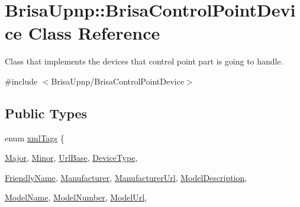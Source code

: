 \hypertarget{classBrisaUpnp_1_1BrisaControlPointDevice}{
\section{BrisaUpnp::BrisaControlPointDevice Class Reference}
\label{classBrisaUpnp_1_1BrisaControlPointDevice}
}


Class that implements the devices that control point part is going to handle.  


{\ttfamily \#include $<$BrisaUpnp/BrisaControlPointDevice$>$}\subsection*{Public Types}
\begin{DoxyCompactItemize}
\item 
enum \hyperlink{classBrisaUpnp_1_1BrisaControlPointDevice_a8aaeeda62adcdbd531f5a14bb52c1739}{xmlTags} \{ \par
\hyperlink{classBrisaUpnp_1_1BrisaControlPointDevice_a8aaeeda62adcdbd531f5a14bb52c1739a67178f0c87df8335b2fb6e3c5f10200c}{Major}, 
\hyperlink{classBrisaUpnp_1_1BrisaControlPointDevice_a8aaeeda62adcdbd531f5a14bb52c1739ab9b6e3b735237263296ca57fb92c2bfb}{Minor}, 
\hyperlink{classBrisaUpnp_1_1BrisaControlPointDevice_a8aaeeda62adcdbd531f5a14bb52c1739a0fe1c61d0f61213034a3c69b18f49875}{UrlBase}, 
\hyperlink{classBrisaUpnp_1_1BrisaControlPointDevice_a8aaeeda62adcdbd531f5a14bb52c1739a4b2f0f599fa7b124063764c379ac5080}{DeviceType}, 
\par
\hyperlink{classBrisaUpnp_1_1BrisaControlPointDevice_a8aaeeda62adcdbd531f5a14bb52c1739a8c139c3a19fc6bf5cdcab6e15ab62337}{FriendlyName}, 
\hyperlink{classBrisaUpnp_1_1BrisaControlPointDevice_a8aaeeda62adcdbd531f5a14bb52c1739acf447e62aeb42ab37051152baeac39a1}{Manufacturer}, 
\hyperlink{classBrisaUpnp_1_1BrisaControlPointDevice_a8aaeeda62adcdbd531f5a14bb52c1739a0f4c45e8f442222041fd88d5ac75ddfa}{ManufacturerUrl}, 
\hyperlink{classBrisaUpnp_1_1BrisaControlPointDevice_a8aaeeda62adcdbd531f5a14bb52c1739aeed7f5557d3563692888bdbcd71cf9c0}{ModelDescription}, 
\par
\hyperlink{classBrisaUpnp_1_1BrisaControlPointDevice_a8aaeeda62adcdbd531f5a14bb52c1739aca05ec471f5c945d03b5fde2e008ad3b}{ModelName}, 
\hyperlink{classBrisaUpnp_1_1BrisaControlPointDevice_a8aaeeda62adcdbd531f5a14bb52c1739ad562f946a781f8bac14cb330a5501b47}{ModelNumber}, 
\hyperlink{classBrisaUpnp_1_1BrisaControlPointDevice_a8aaeeda62adcdbd531f5a14bb52c1739af43d0050aa5dc848f664b0624400a698}{ModelUrl}, 

\end{DoxyCompactItemize}
